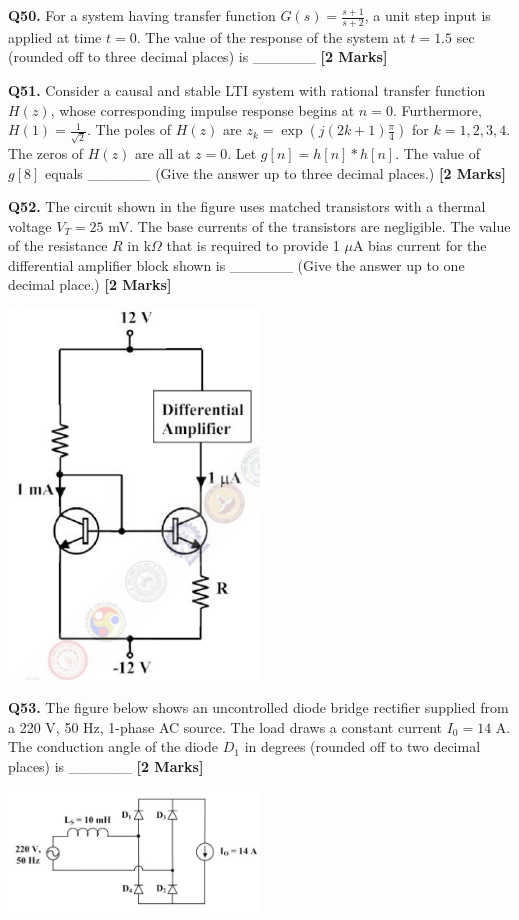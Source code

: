 \documentclass[11pt]{article}
\newcommand{\questionb}[2]{
    \noindent\textbf{Q#2.} #1 \hfill \textbf{[2 Marks]}
}
\begin{document}
\questionb{For a system having transfer function \( G(s) = \frac{s+1}{s+2} \), a unit step input is applied at time \( t = 0 \). The value of the response of the system at \( t = 1.5 \) sec (rounded off to three decimal places) is \_\_\_\_\_\_}{50}
\vspace{0.5cm}

\questionb{Consider a causal and stable LTI system with rational transfer function \( H(z) \), whose corresponding impulse response begins at \( n = 0 \). Furthermore, \( H(1) = \frac{1}{\sqrt{2}} \). The poles of \( H(z) \) are \( z_k = \exp\left(j(2k + 1)\frac{\pi}{4}\right) \) for \( k = 1, 2, 3, 4 \). The zeros of \( H(z) \) are all at \( z = 0 \). Let \( g[n] = h[n] * h[n] \). The value of \( g[8] \) equals \_\_\_\_\_\_ (Give the answer up to three decimal places.)}{51}
\vspace{0.5cm}

\questionb{The circuit shown in the figure uses matched transistors with a thermal voltage \( V_T = 25 \) mV. The base currents of the transistors are negligible. The value of the resistance \( R \) in \( \text{k}\Omega \) that is required to provide 1 \( \mu \)A bias current for the differential amplifier block shown is \_\_\_\_\_\_ (Give the answer up to one decimal place.)}{52}
\begin{center}
\includegraphics[width=0.5\textwidth]{figures/52.png}
\end{center}
\vspace{0.5cm}

\questionb{The figure below shows an uncontrolled diode bridge rectifier supplied from a 220 V, 50 Hz, 1-phase AC source. The load draws a constant current \( I_0 = 14 \) A. The conduction angle of the diode \( D_1 \) in degrees (rounded off to two decimal places) is \_\_\_\_\_\_}{53}
\begin{center}
\includegraphics[width=0.5\textwidth]{figures/53.png}
\end{center}
\vspace{0.5cm}
\end{document}
